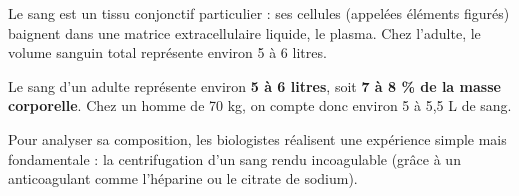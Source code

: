 \documentclass[11pt]{article}
\newcommand{\cle}[1]{{\popxbold\color{popdark}#1}}
\begin{document}
Le sang est un tissu conjonctif particulier : ses cellules (appelées \cle{éléments figurés}) baignent dans une matrice extracellulaire liquide, le \cle{plasma}. Chez l'adulte, le volume sanguin total représente environ 5 à 6 litres.

\begin{propriete}
Le sang d'un adulte représente environ \textbf{5 à 6 litres}, soit \textbf{7 à 8 \% de la masse corporelle}. Chez un homme de 70 kg, on compte donc environ 5 à 5,5 L de sang.
\end{propriete}

Pour analyser sa composition, les biologistes réalisent une expérience simple mais fondamentale : la centrifugation d'un sang rendu incoagulable (grâce à un anticoagulant comme l'héparine ou le citrate de sodium).
\end{document}
